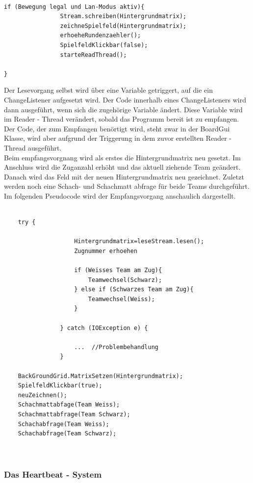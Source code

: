 \documentclass[12pt,a4paper]{article}
\begin{document}
{\lstset{language=java}
\begin{lstlisting}

if (Bewegung legal und Lan-Modus aktiv){
				Stream.schreiben(Hintergrundmatrix);
				zeichneSpielfeld(Hintergrundmatrix);
				erhoeheRundenzaehler();
				SpielfeldKlickbar(false);
				starteReadThread();
				
}
\end{lstlisting}
Der Lesevorgang selbst wird über eine Variable getriggert, auf die ein ChangeListener aufgesetzt wird. Der Code innerhalb eines ChangeListeners wird dann ausgeführt, wenn sich die zugehörige Variable ändert. Diese Variable wird im Reader - Thread verändert, sobald das Programm bereit ist zu empfangen.
Der Code, der zum Empfangen benörtigt wird, steht zwar in der BoardGui Klasse, wird aber aufgrund der Triggerung in dem zuvor erstellten Reader - Thread ausgeführt.\\[2ex]
Beim empfangsvorgnang wird als erstes die Hintergrundmatrix neu gesetzt. Im Anschluss wird die Zuganzahl erhöht und das aktuell ziehende Team geändert.
Danach wird das Feld mit der neuen Hintergrundmatrix neu gezeichnet. Zuletzt werden noch eine Schach- und Schachmatt abfrage für beide Teams durchgeführt.\\[2ex]
Im folgenden Pseudocode wird der Empfangsvorgang anschaulich dargestellt.

\lstset{language=java}
\begin{lstlisting}

	try {

					Hintergrundmatrix=leseStream.lesen();
					Zugnummer erhoehen
					
					if (Weisses Team am Zug){
						Teamwechsel(Schwarz);
					} else if (Schwarzes Team am Zug){
						Teamwechsel(Weiss);
					}

				} catch (IOException e) {
					
					...  //Problembehandlung
				}

	BackGroundGrid.MatrixSetzen(Hintergrundmatrix);
	SpielfeldKlickbar(true);
	neuZeichnen();
	Schachmattabfage(Team Weiss);
	Schachmattabfrage(Team Schwarz);
	Schachabfrage(Team Weiss);
	Schachabfrage(Team Schwarz);
	


\end{lstlisting}


\subsubsection{Das Heartbeat - System}
\label{SUBSUBSEC:HEARTBEAT}

}
\end{document}
